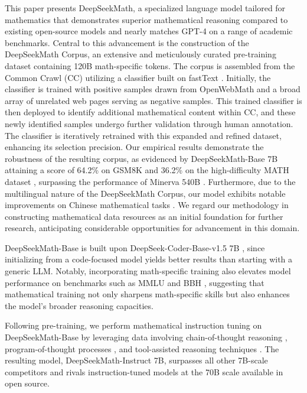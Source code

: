 This paper presents DeepSeekMath, a specialized language model tailored for mathematics that demonstrates superior mathematical reasoning compared to existing open-source models and nearly matches GPT-4 on a range of academic benchmarks. Central to this advancement is the construction of the DeepSeekMath Corpus, an extensive and meticulously curated pre-training dataset containing 120B math-specific tokens. The corpus is assembled from the Common Crawl (CC) utilizing a classifier built on fastText \citep{joulin2016fasttext}. Initially, the classifier is trained with positive samples drawn from OpenWebMath \citep{openwebmath} and a broad array of unrelated web pages serving as negative samples. This trained classifier is then deployed to identify additional mathematical content within CC, and these newly identified samples undergo further validation through human annotation. The classifier is iteratively retrained with this expanded and refined dataset, enhancing its selection precision. Our empirical results demonstrate the robustness of the resulting corpus, as evidenced by DeepSeekMath-Base 7B attaining a score of 64.2\% on GSM8K \citep{gsm8k} and 36.2\% on the high-difficulty MATH dataset \citep{MATH}, surpassing the performance of Minerva 540B \citep{minerva}. Furthermore, due to the multilingual nature of the DeepSeekMath Corpus, our model exhibits notable improvements on Chinese mathematical tasks \citep{wei2023cmath,agieval}. We regard our methodology in constructing mathematical data resources as an initial foundation for further research, anticipating considerable opportunities for advancement in this domain.

DeepSeekMath-Base is built upon DeepSeek-Coder-Base-v1.5 7B \citep{deepseek-coder}, since initializing from a code-focused model yields better results than starting with a generic LLM. Notably, incorporating math-specific training also elevates model performance on benchmarks such as MMLU \citep{mmlu} and BBH \citep{bbh}, suggesting that mathematical training not only sharpens math-specific skills but also enhances the model's broader reasoning capacities.

Following pre-training, we perform mathematical instruction tuning on DeepSeekMath-Base by leveraging data involving chain-of-thought reasoning \citep{cot}, program-of-thought processes \citep{pot,pal}, and tool-assisted reasoning techniques \citep{tora}. The resulting model, DeepSeekMath-Instruct 7B, surpasses all other 7B-scale competitors and rivals instruction-tuned models at the 70B scale available in open source.

